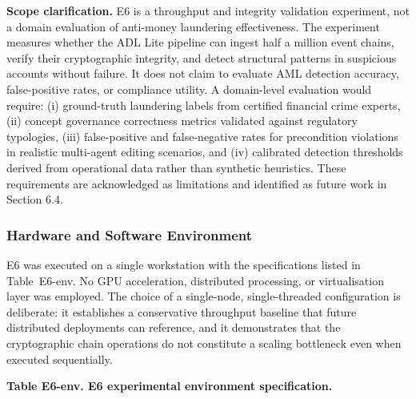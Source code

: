 \textbf{Scope clarification.} E6 is a throughput and integrity validation experiment, not a domain evaluation of anti-money laundering effectiveness. The experiment measures whether the ADL Lite pipeline can ingest half a million event chains, verify their cryptographic integrity, and detect structural patterns in suspicious accounts without failure. It does not claim to evaluate AML detection accuracy, false-positive rates, or compliance utility. A domain-level evaluation would require: (i) ground-truth laundering labels from certified financial crime experts, (ii) concept governance correctness metrics validated against regulatory typologies, (iii) false-positive and false-negative rates for precondition violations in realistic multi-agent editing scenarios, and (iv) calibrated detection thresholds derived from operational data rather than synthetic heuristics. These requirements are acknowledged as limitations and identified as future work in Section 6.4.

\subsubsection{Hardware and Software Environment}\label{hardware-and-software-environment}

E6 was executed on a single workstation with the specifications listed in Table~E6-env. No GPU acceleration, distributed processing, or virtualisation layer was employed. The choice of a single-node, single-threaded configuration is deliberate: it establishes a conservative throughput baseline that future distributed deployments can reference, and it demonstrates that the cryptographic chain operations do not constitute a scaling bottleneck even when executed sequentially.

\textbf{Table E6-env. E6 experimental environment specification.}

